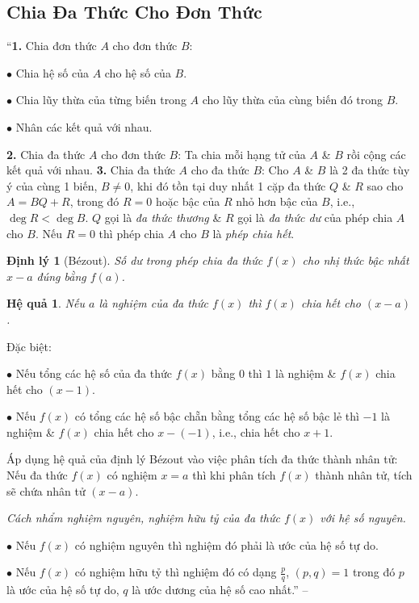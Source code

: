 \documentclass{article}
\numberwithin{equation}{section}
\newtheorem{hequa}{Hệ quả}[section]
\newtheorem{dinhly}{Định lý}[section]
\begin{document}

\subsection{Chia Đa Thức Cho Đơn Thức}
``\textbf{1.} Chia đơn thức $A$ cho đơn thức $B$:
\begin{enumerate*}
	\item[$\bullet$] Chia hệ số của $A$ cho hệ số của $B$.
	\item[$\bullet$] Chia lũy thừa của từng biến trong $A$ cho lũy thừa của cùng biến đó trong $B$.
	\item[$\bullet$] Nhân các kết quả với nhau.
\end{enumerate*}
\textbf{2.} Chia đa thức $A$ cho đơn thức $B$: Ta chia mỗi hạng tử của $A$ \& $B$ rồi cộng các kết quả với nhau. \textbf{3.} Chia đa thức $A$ cho đa thức $B$: Cho $A$ \& $B$ là 2 đa thức tùy ý của cùng 1 biến, $B\ne 0$, khi đó tồn tại duy nhất 1 cặp đa thức $Q$ \& $R$ sao cho $A = BQ + R$, trong đó $R = 0$ hoặc bậc của $R$ nhỏ hơn bậc của $B$, i.e., $\deg R < \deg B$. $Q$ gọi là \textit{đa thức thương} \& $R$ gọi là \textit{đa thức dư} của phép chia $A$ cho $B$. Nếu $R = 0$ thì phép chia $A$ cho $B$ là \textit{phép chia hết}.

\begin{dinhly}[B\'ezout]
	Số dư trong phép chia đa thức $f(x)$ cho nhị thức bậc nhất $x - a$ đúng bằng $f(a)$.
\end{dinhly}

\begin{hequa}
	Nếu $a$ là nghiệm của đa thức $f(x)$ thì $f(x)$ chia hết cho $(x - a)$.
\end{hequa}
Đặc biệt:
\begin{enumerate*}
	\item[$\bullet$] Nếu tổng các hệ số của đa thức $f(x)$ bằng $0$ thì $1$ là nghiệm \& $f(x)$ chia hết cho $(x - 1)$.
	\item[$\bullet$] Nếu $f(x)$ có tổng các hệ số bậc chẵn bằng tổng các hệ số bậc lẻ thì $-1$ là nghiệm \& $f(x)$ chia hết cho $x - (-1)$, i.e., chia hết cho $x + 1$.
\end{enumerate*}
Áp dụng hệ quả của định lý B\'ezout vào việc phân tích đa thức thành nhân tử: Nếu đa thức $f(x)$ có nghiệm $x = a$ thì khi phân tích $f(x)$ thành nhân tử, tích sẽ chứa nhân tử $(x - a)$.

\textit{Cách nhẩm nghiệm nguyên, nghiệm hữu tỷ của đa thức $f(x)$ với hệ số nguyên.}
\begin{enumerate*}
	\item[$\bullet$] Nếu $f(x)$ có nghiệm nguyên thì nghiệm đó phải là ước của hệ số tự do.
	\item[$\bullet$] Nếu $f(x)$ có nghiệm hữu tỷ thì nghiệm đó có dạng $\frac{p}{q}$, $(p,q) = 1$ trong đó $p$ là ước của hệ số tự do, $q$ là ước dương của hệ số cao nhất.'' -- \cite[pp. 22--23]{Tuyen_Toan_8}
\end{enumerate*}
\end{document}
